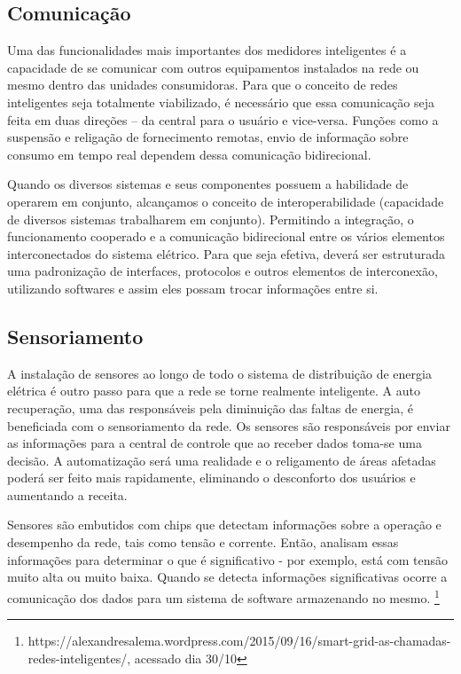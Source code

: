 \subsection{Comunicação}

	Uma das funcionalidades mais importantes dos medidores inteligentes é a capacidade de se comunicar com outros equipamentos instalados na rede ou mesmo dentro das unidades consumidoras. Para que o conceito de redes inteligentes seja totalmente viabilizado, é necessário que essa comunicação seja feita em duas direções – da central para o usuário e vice-versa. Funções como a suspensão e religação de fornecimento remotas, envio de informação sobre consumo em tempo real dependem dessa comunicação bidirecional.

	Quando os diversos sistemas e seus componentes possuem a habilidade de operarem em conjunto, alcançamos o conceito de interoperabilidade (capacidade de diversos sistemas trabalharem em conjunto). Permitindo a integração, o funcionamento cooperado e a comunicação bidirecional entre os vários elementos interconectados do sistema elétrico. Para que seja efetiva, deverá ser estruturada uma padronização de interfaces, protocolos e outros elementos de interconexão, utilizando softwares e assim eles possam trocar informações entre si.

\subsection{Sensoriamento}

	A instalação de sensores ao longo de todo o sistema de distribuição de energia elétrica é outro passo para que a rede se torne realmente inteligente. A auto recuperação, uma das responsáveis pela diminuição das faltas de energia, é beneficiada com o sensoriamento da rede. Os sensores são responsáveis por enviar as informações para a central de controle que ao receber dados toma-se uma decisão. A automatização será uma realidade e o religamento de áreas afetadas poderá ser feito mais rapidamente, eliminando o desconforto dos usuários e aumentando a receita.

	Sensores são embutidos com chips que detectam informações sobre a operação e desempenho da rede, tais como tensão e corrente. Então, analisam essas informações para determinar o que é significativo - por exemplo, está com tensão muito alta ou muito baixa. Quando se detecta informações significativas ocorre a comunicação dos dados para um sistema de software armazenando no mesmo. \footnote{https://alexandresalema.wordpress.com/2015/09/16/smart-grid-as-chamadas-redes-inteligentes/, acessado dia 30/10}

